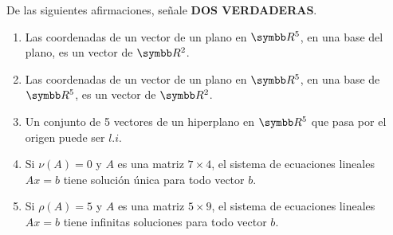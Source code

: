 \item De las siguientes afirmaciones, señale \textbf{DOS VERDADERAS}.
    \begin{enumerate}[label=\listAlph]
        \item Las coordenadas de un vector de un plano en \(\realR^5\), en una base del plano, es un vector de \(\realR^2\).
        \item Las coordenadas de un vector de un plano en \(\realR^5\), en una base de \(\realR^5\), es un vector de \(\realR^2\).
        \item Un conjunto de 5 vectores de un hiperplano en \(\realR^5\) que pasa por el origen puede ser \(l.i\).
        \item Si \(\nu(A) = 0\) y \(A\) es una matriz \(7 \times 4\), el sistema de ecuaciones lineales \(Ax = b\) tiene solución única para todo vector \(b\).
        \item Si \(\rho(A) = 5\) y \(A\) es una matriz \(5 \times 9\), el sistema de ecuaciones lineales \(Ax = b\) tiene infinitas soluciones para todo vector \(b\).
    \end{enumerate}
